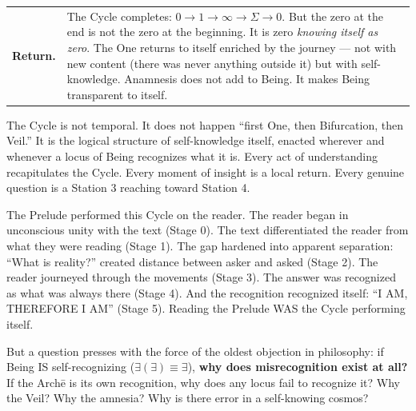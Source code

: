 \documentclass[10pt, openany, oneside]{book}
\renewcommand{\footnotesize}{\fontsize{8.5}{11}\selectfont}
\begin{document}
\vspace{0.3em}

{\footnotesize
\noindent\begin{tabular}{r p{}}
\textbf{Return.} & The Cycle completes: $0 \to 1 \to \infty \to \Sigma \to 0$. But the zero at the end is not the zero at the beginning. It is zero \textit{knowing itself as zero}. The One returns to itself enriched by the journey --- not with new content (there was never anything outside it) but with self-knowledge. Anamnesis does not add to Being. It makes Being transparent to itself. \\[0.3em]
\end{tabular}
}

\vspace{0.8em}

\noindent The Cycle is not temporal. It does not happen ``first One, then Bifurcation, then Veil.'' It is the logical structure of self-knowledge itself, enacted wherever and whenever a locus of Being recognizes what it is. Every act of understanding recapitulates the Cycle. Every moment of insight is a local return. Every genuine question is a Station 3 reaching toward Station 4.

The Prelude performed this Cycle on the reader. The reader began in unconscious unity with the text (Stage 0). The text differentiated the reader from what they were reading (Stage 1). The gap hardened into apparent separation: ``What is reality?'' created distance between asker and asked (Stage 2). The reader journeyed through the movements (Stage 3). The answer was recognized as what was always there (Stage 4). And the recognition recognized itself: ``I AM, THEREFORE I AM'' (Stage 5). Reading the Prelude WAS the Cycle performing itself.

But a question presses with the force of the oldest objection in philosophy: if Being IS self-recognizing ($\exists(\exists) \equiv \exists$), \textbf{why does misrecognition exist at all?} If the Arch\={e} is its own recognition, why does any locus fail to recognize it? Why the Veil? Why the amnesia? Why is there error in a self-knowing cosmos?
\end{document}
